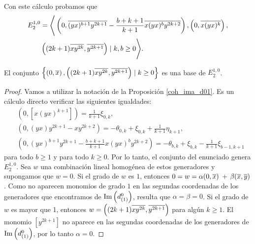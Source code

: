 \documentclass[fleqn,../tesis.tex]{subfiles}
\begin{document}
Con este cálculo probamos que
\begin{align*}
     E^{1,0}_{2} &= \Bigg\langle \left(0, \overline{(yx)^{b + 1}y^{2k + 1}} - \frac{b + k + 1}{k + 1}\overline{x(yx)^{b}y^{2k + 2}}\right),
         \left(0, \overline{x(yx)^{k}}\right),\\
      &\left((2k + 1)\overline{xy^{2k}}, \overline{y^{2k + 1}}\right) \mid k, b \geq 0\Bigg\rangle.
\end{align*}
\begin{prop}
    El conjunto $\left\lbrace\left(0, \overline{x}\right), \left((2k + 1)\overline{xy^{2k}}, \overline{y^{2k + 1}}\right) \mid k\geq 0 \right\rbrace$
    es una base de $E^{1, 0}_2$.
\end{prop}
\begin{proof}
Vamos a utilizar la notación de la Proposición \ref{coh_ima_d01}. Es un cálculo directo verificar las siguientes igualdades:
\begin{align*}
    &\left(0, \left[x(yx)^{k + 1}\right]\right) = \frac{1}{k + 1}\xi_{0, k},\\
    &\left(0, (yx)y^{2k + 1} - xy^{2k + 2}\right) = -\theta_{0, k} + \xi_{0, k} + \frac{1}{k + 1}\eta_{k + 1},\\
    &\left(0, (yx)^{b + 1}y^{2k + 1} - \frac{b +k + 1}{k + 1}x(yx)^{b}y^{2k + 2}\right)
        = -\theta_{b, k} + \xi_{b, k} -\frac{1}{k + 1}\xi_{b - 1, k + 1}
\end{align*}
para todo $b \geq 1$ y para todo $k \geq 0$. Por lo tanto, el conjunto del enunciado genera $E^{1, 0}_2$. Sea $w$
una combinación lineal homogénea de estos generadores y supongamos que $w = 0$. Si el grado de $w$ es $1$, entonces
$0 = w = \alpha (0, \overline{x})$ + $\beta(\overline{x}, \overline{y})$. Como no aparecen monomios de grado $1$ en las segundas coordenadas
de los generadores que encontramos de $\operatorname{Im}\left(d^{0}_{(1)}\right)$, resulta que $\alpha = \beta = 0$. Si el grado
de $w$ es mayor que 1, entonces $w = \left((2k + 1)\overline{xy^{2k}}, \overline{y^{2k + 1}}\right)$ para algún $k \geq 1$. El monomio
$\left[y^{2k + 1}\right]$ no aparece en las segundas coordenadas de los generadores de $\operatorname{Im}\left(d^{0}_{(1)}\right)$, por lo tanto
$\alpha = 0$.
\end{proof}
\end{document}
